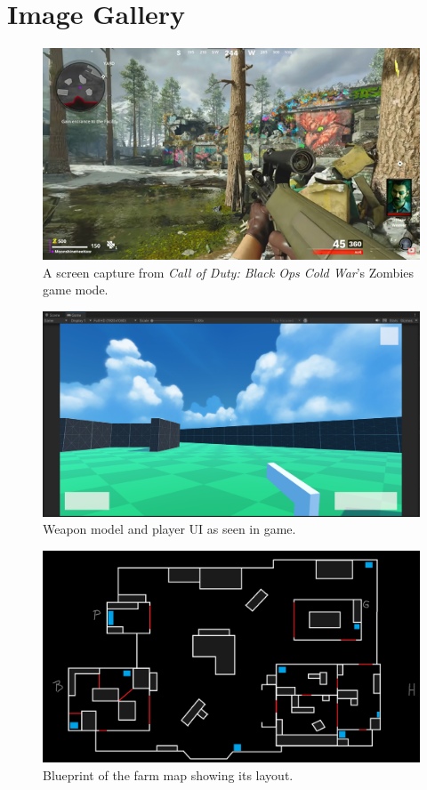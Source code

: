 \documentclass[11pt]{article}
\begin{document}
\section{Image Gallery}
\begin{figure}[htb] 
    \centering
    \includegraphics[width=\columnwidth]{inspo}
    \caption{A screen capture from \textit{Call of Duty: Black Ops Cold War}'s Zombies game mode.}
    \label{fig:inspo}
\end{figure}

\begin{figure}[htb] 
    \centering
    \includegraphics[width=\columnwidth]{weapon}
    \caption{Weapon model and player UI as seen in game.}
    \label{fig:weapon}
\end{figure}

\begin{figure}[htb] 
    \centering
    \includegraphics[width=\columnwidth]{farm-bp}
    \caption{Blueprint of the farm map showing its layout.}
    \label{fig:farm-bp}
\end{figure}

\clearpage
\end{document}

